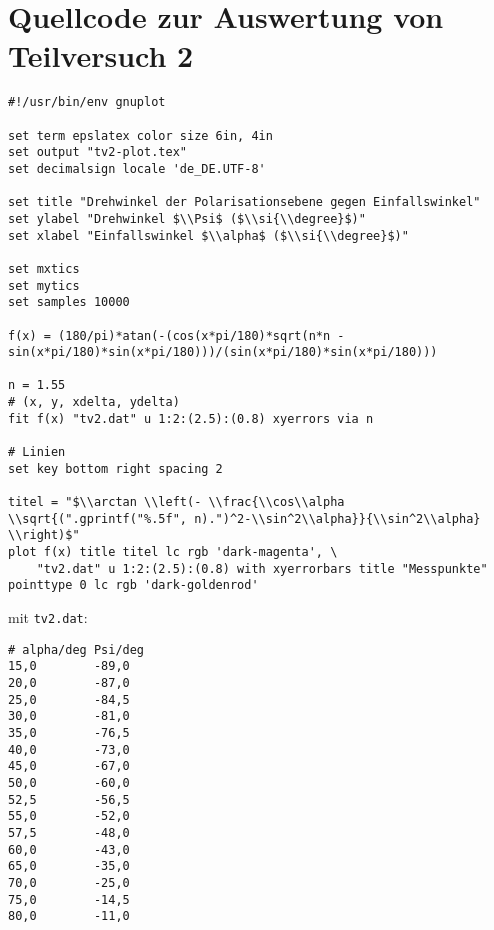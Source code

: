 \section{\gnuplot{} Quellcode zur Auswertung von Teilversuch 2}
    \label{appdx:tv2-gnuplot}
    {  
        \renewcommand{\fcolorbox}[4][]{#4}
        \begin{verbatim}
#!/usr/bin/env gnuplot

set term epslatex color size 6in, 4in
set output "tv2-plot.tex"
set decimalsign locale 'de_DE.UTF-8'

set title "Drehwinkel der Polarisationsebene gegen Einfallswinkel"
set ylabel "Drehwinkel $\\Psi$ ($\\si{\\degree}$)"
set xlabel "Einfallswinkel $\\alpha$ ($\\si{\\degree}$)"

set mxtics
set mytics
set samples 10000

f(x) = (180/pi)*atan(-(cos(x*pi/180)*sqrt(n*n - sin(x*pi/180)*sin(x*pi/180)))/(sin(x*pi/180)*sin(x*pi/180)))

n = 1.55
# (x, y, xdelta, ydelta)
fit f(x) "tv2.dat" u 1:2:(2.5):(0.8) xyerrors via n

# Linien
set key bottom right spacing 2

titel = "$\\arctan \\left(- \\frac{\\cos\\alpha \\sqrt{(".gprintf("%.5f", n).")^2-\\sin^2\\alpha}}{\\sin^2\\alpha} \\right)$"
plot f(x) title titel lc rgb 'dark-magenta', \
    "tv2.dat" u 1:2:(2.5):(0.8) with xyerrorbars title "Messpunkte" pointtype 0 lc rgb 'dark-goldenrod'
        \end{verbatim}
    }
    mit \texttt{tv2.dat}:
    \begin{multicols}{2}
        \begin{verbatim}
# alpha/deg Psi/deg
15,0        -89,0
20,0        -87,0
25,0        -84,5
30,0        -81,0
35,0        -76,5
40,0        -73,0
45,0        -67,0
50,0        -60,0
52,5        -56,5
55,0        -52,0
57,5        -48,0
60,0        -43,0
65,0        -35,0
70,0        -25,0
75,0        -14,5
80,0        -11,0
        \end{verbatim}
    \end{multicols}
